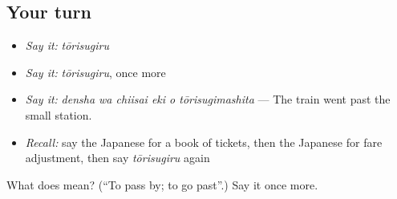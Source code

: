\subsection*{Your turn}
\begin{itemize}
\raggedright
  \item \emph{Say it:} \emph{tōrisugiru}
  \item \emph{Say it:} \emph{tōrisugiru}, once more
  \item \emph{Say it:} \emph{densha wa chiisai eki o tōrisugimashita} — The train went past the small station.
  \item \emph{Recall:} say the Japanese for a book of tickets, then the Japanese for fare adjustment, then say \emph{tōrisugiru} again
\end{itemize}

\begin{tcolorbox}[breakable,colback=teal!4,colframe=teal!35!black,title={Before you move on}]
What does  mean? (\textquotedblleft{}To pass by; to go past\textquotedblright{}.) Say it once more.
\end{tcolorbox}
